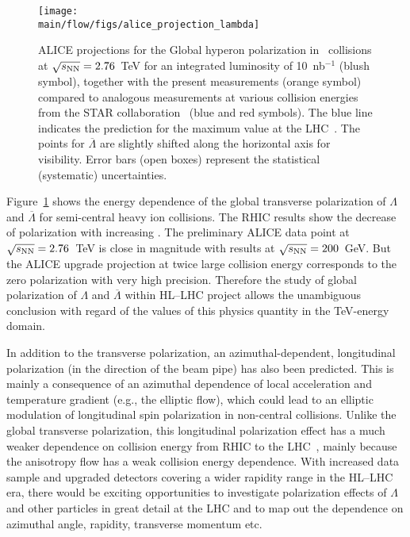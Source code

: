 \begin{figure*}[!htb]
\begin{center}
\texttt{[image: \\main/flow/figs/alice\_projection\_lambda]}
\caption{
ALICE projections for the Global hyperon polarization in \pbpb\ 
  collisions at $\sqrt{s_{\mathrm{NN}}}=2.76$~TeV for an integrated luminosity of 
  10~nb$^{-1}$ (blush symbol), together with the present measurements (orange symbol) 
  compared to analogous measurements at various collision energies from the STAR 
  collaboration~\cite{STAR:2017ckg, Abelev:2007zk} (blue and red symbols). 
The blue line indicates the prediction for the maximum value at the 
  LHC~\cite{Voloshin:ICPPA2}. 
The points for $\overline{\Lambda}$ are slightly shifted along the horizontal 
  axis for visibility.  
Error bars (open boxes) represent the statistical (systematic) uncertainties.}
\label{fig:alice_lambda}
\end{center}
\end{figure*}

Figure~\ref{fig:alice_lambda} shows the energy dependence of the global 
  transverse polarization of $\Lambda$ and $\overline{\Lambda}$ for
  semi-central heavy ion collisions. 
The RHIC results show the decrease of polarization with increasing \snn. 
The preliminary ALICE data point at $\sqrt{s_{\mathrm{NN}}}=2.76$~TeV is close in magnitude 
  with results at $\sqrt{s_{\mathrm{NN}}}=200$~GeV. 
But the ALICE upgrade projection at twice large collision energy corresponds 
  to the zero polarization with very high precision. 
Therefore the study of global polarization of $\Lambda$ and $\overline{\Lambda}$ 
  within HL--LHC project allows the unambiguous conclusion with regard of the 
  values of this physics quantity in the TeV-energy domain. 

In addition to the transverse polarization, an azimuthal-dependent, 
  longitudinal polarization (in the direction of the beam pipe) has 
  also been predicted. 
This is mainly a consequence of an azimuthal dependence of local acceleration 
  and temperature gradient (e.g., the elliptic flow), which could lead to an 
  elliptic modulation of longitudinal spin polarization in 
  non-central collisions. 
Unlike the global transverse polarization, this longitudinal polarization 
  effect has a much weaker dependence on collision energy from RHIC to 
  the LHC~\cite{Karpenko:2017dui}, mainly because the anisotropy flow has a 
  weak collision energy dependence. 
With increased data sample and upgraded detectors covering a wider rapidity 
  range in the HL--LHC era, there would be exciting opportunities to 
  investigate polarization effects of $\Lambda$ and other particles in great 
  detail at the LHC and to map out the dependence on azimuthal angle, 
  rapidity, transverse momentum etc.

